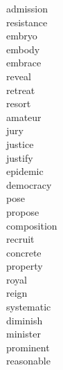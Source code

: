 \documentclass[a4paper, 10pt]{ctexart}
\begin{document}
\begin{multicols*}{2}
\begin{description}
\item[admission]

\item[resistance]

\item[embryo]

\item[embody]

\item[embrace]

\item[reveal]

\item[retreat]

\item[resort]

\item[amateur]

\item[jury]

\item[justice]

\item[justify]

\item[epidemic]

\item[democracy]

\item[pose]

\item[propose]

\item[composition]

\item[recruit]

\item[concrete]

\item[property]

\item[royal]

\item[reign]

\item[systematic]

\item[diminish]

\item[minister]

\item[prominent]

\item[reasonable]


\end{description}
\end{multicols*}
\end{document}
